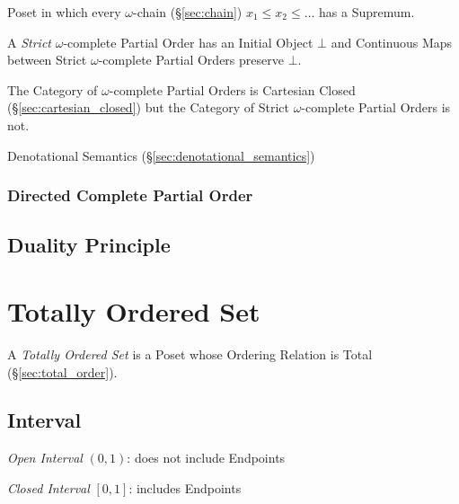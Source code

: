 Poset in which every $\omega$-chain (\S\ref{sec:chain}) $x_1 \leq x_2
\leq \ldots$ has a Supremum.

A \emph{Strict} $\omega$-complete Partial Order has an Initial Object
$\bot$ and Continuous Maps between Strict $\omega$-complete Partial
Orders preserve $\bot$.

The Category of $\omega$-complete Partial Orders is Cartesian Closed
(\S\ref{sec:cartesian_closed}) but the Category of Strict
$\omega$-complete Partial Orders is not.

Denotational Semantics (\S\ref{sec:denotational_semantics})



\subsubsection{Directed Complete Partial Order}\label{sec:dcpo}



\subsection{Duality Principle}\label{sec:duality_principle}



\section{Totally Ordered Set}\label{sec:totally_ordered}

A \emph{Totally Ordered Set} is a Poset whose Ordering Relation is
Total (\S\ref{sec:total_order}).



\subsection{Interval}\label{sec:interval}

\emph{Open Interval} $(0,1)$: does not include Endpoints

\emph{Closed Interval} $[0,1]$: includes Endpoints

